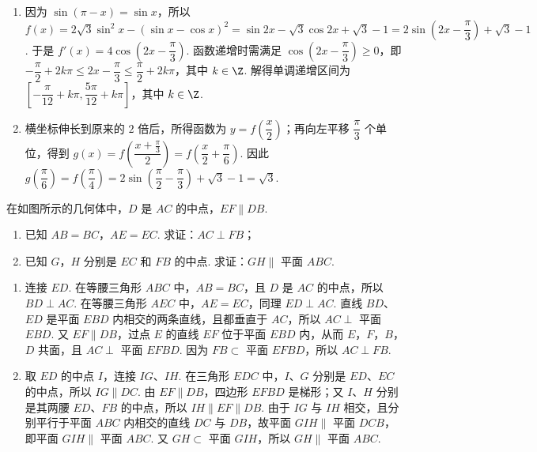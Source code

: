 \begin{solution}
\begin{enumerate}
\item 因为 \(\sin(\pi-x)=\sin x\)，所以
\(f(x)=2\sqrt3\sin^2x-(\sin x-\cos x)^2=\sin2x-\sqrt3\cos2x+\sqrt3-1=2\sin\left(2x-\dfrac\pi3\right)+\sqrt3-1\). 于是 \(f'(x)=4\cos\left(2x-\dfrac\pi3\right)\). 函数递增时需满足
\(\cos\left(2x-\dfrac\pi3\right)\geq0\)，即 \(-\dfrac\pi2+2k\pi\leq2x-\dfrac\pi3\leq\dfrac\pi2+2k\pi\)，其中 \(k\in\Z\). 解得单调递增区间为 \(\left[-\dfrac\pi{12}+k\pi,\dfrac{5\pi}{12}+k\pi\right]\)，其中 \(k\in\Z\).
\item 横坐标伸长到原来的 \(2\) 倍后，所得函数为 \(y=f\left(\dfrac x2\right)\)；再向左平移 \(\dfrac\pi3\) 个单位，得到 \(g(x)=f\left(\dfrac{x+\frac{\pi}{3}}{2}\right)=f\left(\dfrac x2+\dfrac\pi6\right)\). 因此 \(g\left(\dfrac\pi6\right)=f\left(\dfrac\pi4\right)=2\sin\left(\dfrac\pi2-\dfrac\pi3\right)+\sqrt3-1=\sqrt3\).
\end{enumerate}
\end{solution}

\begin{problem}
在如图所示的几何体中，\(D\) 是 \(AC\) 的中点，\(EF\parallel DB\).

\begin{enumerate}
\item 已知 \(AB=BC\)，\(AE=EC\). 求证：\(AC\perp FB\)；
\item 已知 \(G\)，\(H\) 分别是 \(EC\) 和 \(FB\) 的中点. 求证：\(GH\parallel\) 平面 \(ABC\).
\end{enumerate}

\end{problem}

\begin{solution}
\begin{enumerate}
\item 连接 \(ED\). 在等腰三角形 \(ABC\) 中，\(AB=BC\)，且 \(D\) 是 \(AC\) 的中点，所以 \(BD\perp AC\). 在等腰三角形 \(AEC\) 中，\(AE=EC\)，同理 \(ED\perp AC\). 直线 \(BD\)、\(ED\) 是平面 \(EBD\) 内相交的两条直线，且都垂直于 \(AC\)，所以 \(AC\perp\) 平面 \(EBD\). 又 \(EF\parallel DB\)，过点 \(E\) 的直线 \(EF\) 位于平面 \(EBD\) 内，从而 \(E\)，\(F\)，\(B\)，\(D\) 共面，且 \(AC\perp\) 平面 \(EFBD\). 因为 \(FB\subset\) 平面 \(EFBD\)，所以 \(AC\perp FB\).
\item 取 \(ED\) 的中点 \(I\)，连接 \(IG\)、\(IH\). 在三角形 \(EDC\) 中，\(I\)、\(G\) 分别是 \(ED\)、\(EC\) 的中点，所以 \(IG\parallel DC\). 由 \(EF\parallel DB\)，四边形 \(EFBD\) 是梯形；又 \(I\)、\(H\) 分别是其两腰 \(ED\)、\(FB\) 的中点，所以 \(IH\parallel EF\parallel DB\). 由于 \(IG\) 与 \(IH\) 相交，且分别平行于平面 \(ABC\) 内相交的直线 \(DC\) 与 \(DB\)，故平面 \(GIH\parallel\) 平面 \(DCB\)，即平面 \(GIH\parallel\) 平面 \(ABC\). 又 \(GH\subset\) 平面 \(GIH\)，所以 \(GH\parallel\) 平面 \(ABC\).
\end{enumerate}
\end{solution}

